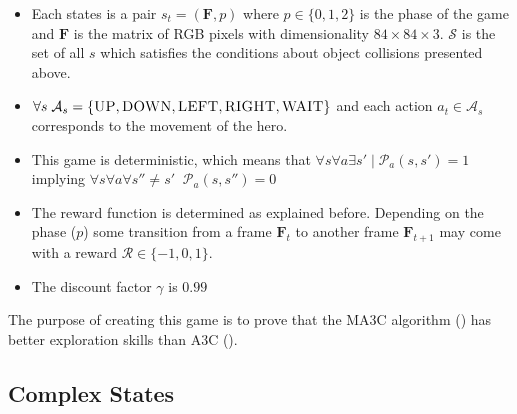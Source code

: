 \begin{itemize}
    \item Each states is a pair $s_t = (\mathbf{F}, p)$ where $p \in \{0,1,2\}$ is the phase of the game and
    $\mathbf{F}$ is the matrix of RGB pixels with dimensionality $84\times84\times3$.
    $\mathcal{S}$ is the set of all $s$ which satisfies the conditions about object collisions presented above.

    \item $\forall s \; \mathcal{A}_s = \{\textsc{UP}, \textsc{DOWN}, \textsc{LEFT}, \textsc{RIGHT}, \textsc{WAIT}\}$ and each action $a_{t}\in \mathcal{A}_s $ corresponds to
    the movement of the hero.

    \item This game is deterministic, which means that $\forall s\forall a\exists s' \; |\; \mathcal{P}_a(s,s') = 1$ implying
    $\forall s\forall a\forall {s''\neq s'} \;\; \mathcal{P}_a(s,s'') = 0$

    \item The reward function is determined as explained before.
    Depending on the phase ($p$) some transition from a frame $\mathbf{F}_t$
    to another frame $\mathbf{F}_{t+1}$ may come with a reward $\mathcal{R} \in \{ -1, 0, 1\}$.

    \item The discount factor $\gamma$ is $0.99$
\end{itemize}

The purpose of creating this game is to prove that the \ac{MA3C} algorithm () has better exploration
skills than A3C ().

\subsection{Complex States\label{subsec:ComplexStates}}

